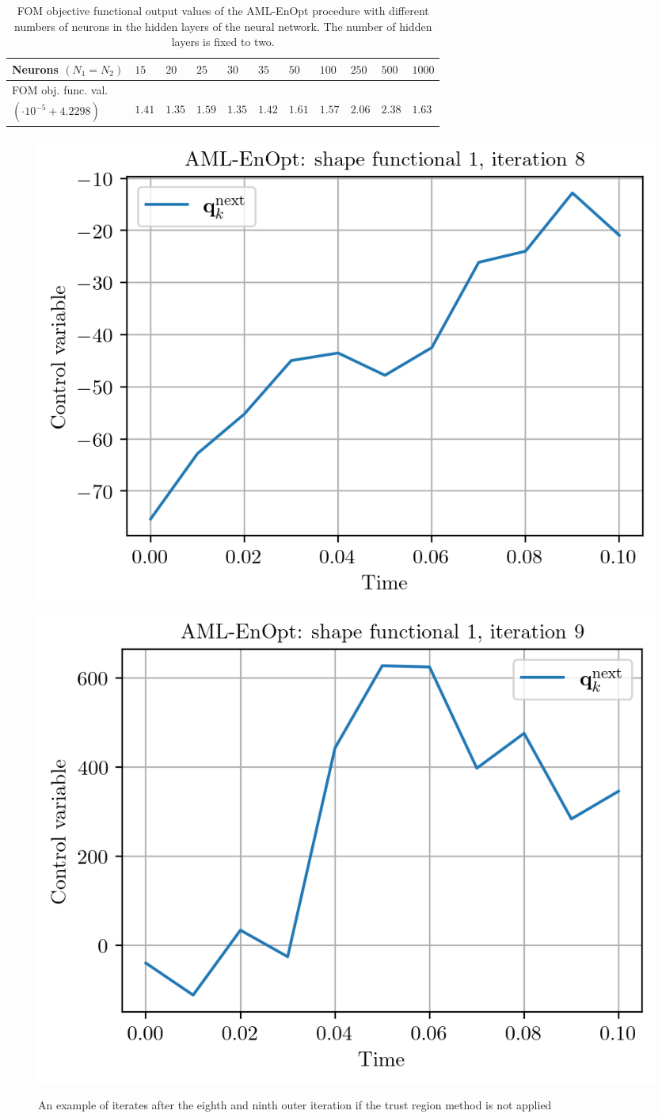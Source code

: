 \begin{table}[h]
\caption{\label{DNNStructFOMComparison} FOM objective functional output values of the AML-EnOpt procedure with different numbers of neurons in the hidden layers of the neural network. The number of hidden layers is fixed to two.}
\centering
\begin{tabular}{|l|llllllllll|}
\hline
Neurons $(N_1=N_2)$& $15$ & $20$ & $25$ & $30$ & $35$ & $50$ & $100$ & $250$ & $500$ & $1000$\\
\hline
FOM obj. func. val.&&&&&&&&&&\\
$(\cdot 10^{-5}+4.2298)$& $1.41$ & $1.35$ & $1.59$ & $1.35$ & $1.42$ & $1.61$ & $1.57$ & $2.06$ & $2.38$ & $1.63$\\
\hline
\end{tabular}
\end{table}

\begin{figure}
\centering
\includegraphics{Plots/noTRIteration8.png}
\includegraphics{Plots/noTRIteration9.png}
\caption{\label{noTRResults}An example of iterates after the eighth and ninth outer iteration if the trust region method is not applied}
\end{figure}